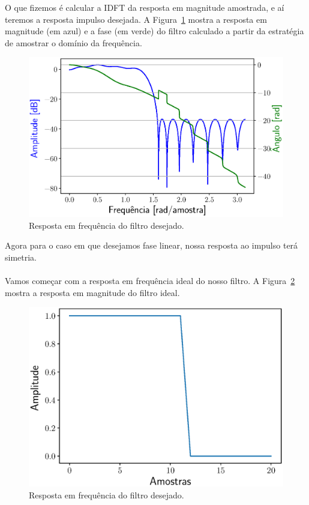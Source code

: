 \documentclass{homeworkclass}
\begin{document}
\begin{homeworkProblem}
\begin{homeworkSection}
O que fizemos é calcular a IDFT da resposta em magnitude amostrada, e aí teremos a resposta impulso desejada. A Figura~\ref{fig:freq_nl} mostra a resposta em magnitude (em azul) e a fase (em verde) do filtro calculado a partir da estratégia de amostrar o domínio da frequência.
\begin{figure}[!ht]
	\centering
	\includegraphics[width=0.6\linewidth]{figs/freq_nl}
	\caption{Resposta em frequência do filtro desejado.}
	\label{fig:freq_nl}
\end{figure}



\end{homeworkSection}


\begin{homeworkSection}

Agora para o caso em que desejamos fase linear, nossa resposta ao impulso terá simetria.

\paragraph{}Vamos começar com a resposta em frequência ideal do nosso filtro. A Figura~\ref{fig:ideal} mostra a resposta em magnitude do filtro ideal.

\begin{figure}[!ht]
	\centering
	\includegraphics[width=0.6\linewidth]{figs/ideal}
	\caption{Resposta em frequência do filtro desejado.}
	\label{fig:ideal}
\end{figure}


\end{homeworkSection}
\end{homeworkProblem}
\end{document}
